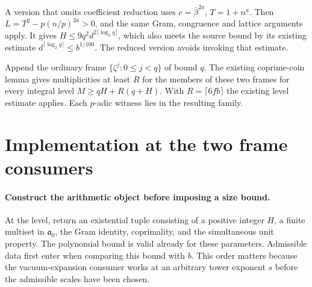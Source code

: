 \documentclass[11pt,letterpaper]{article}
\newcommand{\cod}[1]{\texttt{\detokenize{#1}}}
\begin{document}
A version that omits coefficient reduction uses $c=\bar\beta^{2a}$,
$T=1+n^a$. Then $L=T^2-p(n/p)^{2a}>0$, and the same Gram, congruence
and lattice arguments apply. It gives
$H\le9q^2d^{2\lceil\log_2q\rceil}$, which also meets the source bound
by its existing estimate $d^{\lceil\log_2q\rceil}\le b^{1/100}$.
The reduced version avoids invoking that estimate.

Append the ordinary frame $\{\zeta^j:0\le j<q\}$ of bound $q$.
The existing coprime-coin lemma gives multiplicities at least $R$ for
the members of these two frames for every integral level
$M\ge qH+R(q+H)$. With $R=\lceil 6fb\rceil$ the existing level
estimate applies. Each $p$-adic witness lies in the resulting family.

\section{Implementation at the two frame consumers}

\paragraph{Construct the arithmetic object before imposing a size bound.}
At the \cod{Parameters} level, return an existential tuple consisting of a positive integer $H$, a finite multiset in $\mathfrak a_0$, the Gram identity, coprimality, and the simultaneous unit property. The polynomial bound is valid already for these parameters. Admissible data first enter when comparing this bound with $b$. This order matters because the vacuum-expansion consumer works at an arbitrary tower exponent $s$ before the admissible scales have been chosen.
\end{document}
